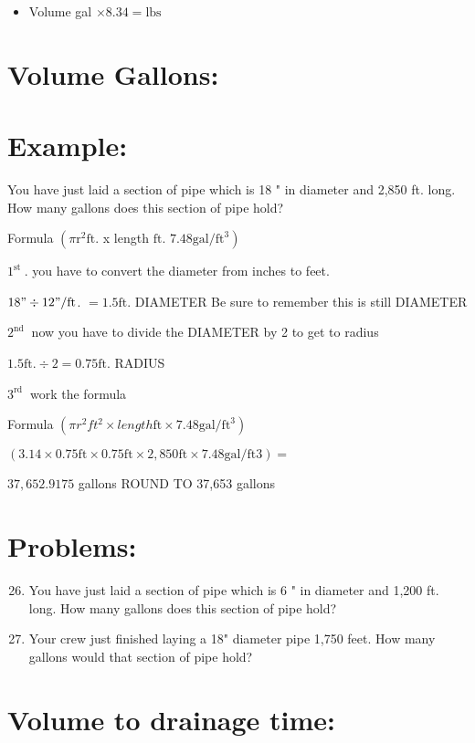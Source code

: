\begin{enumerate}
\begin{itemize}
  \item Volume gal $\times 8.34=\mathrm{lbs}$

\end{itemize}
\section{Volume Gallons:}
\section{Example:}
You have just laid a section of pipe which is 18 " in diameter and 2,850 ft. long. How many gallons does this section of pipe hold?

Formula $\left(\pi \mathrm{r}^{2} \mathrm{ft}\right.$. x length $\mathrm{ft}$. $\left.7.48 \mathrm{gal} / \mathrm{ft}^{3}\right)$

$1^{\text {st }}$. you have to convert the diameter from inches to feet.

$18 " \div 12 " / \mathrm{ft}$. $=1.5 \mathrm{ft}$. DIAMETER Be sure to remember this is still DIAMETER

$2^{\text {nd }}$ now you have to divide the DIAMETER by 2 to get to radius

$1.5 \mathrm{ft} . \div 2=0.75 \mathrm{ft}$. RADIUS

$3^{\text {rd }}$ work the formula

Formula $\left(\pi r^{2} ft^2 \right.\times length \mathrm{ft}\times \left.7.48 \mathrm{gal} / \mathrm{ft}^{3}\right)$

$(3.14 \times 0.75 \mathrm{ft} \times 0.75 \mathrm{ft}\times 2,850 \mathrm{ft} \times 7.48 \mathrm{gal} / \mathrm{ft} 3)=$

$37,652.9175$ gallons ROUND TO 37,653 gallons

\section{Problems:}
\begin{enumerate}
  \setcounter{enumi}{25}
  \item You have just laid a section of pipe which is 6 " in diameter and 1,200 ft. long. How many gallons does this section of pipe hold?

  \item Your crew just finished laying a 18" diameter pipe 1,750 feet. How many gallons would that section of pipe hold?

\end{enumerate}
\section{Volume to drainage time:}

\end{enumerate}
